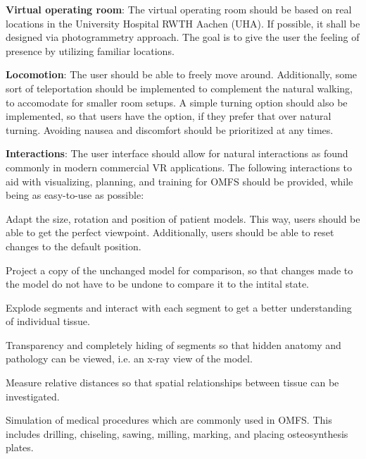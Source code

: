 \begin{compactenum}[label=(\textbf{\alph*})]
    \item\label{req::F1} \textbf{Virtual operating room}: The virtual operating room should be based on real locations in the University Hospital RWTH Aachen (UHA).
    If possible, it shall be designed via photogrammetry approach. The goal is to give the user the feeling of presence by utilizing familiar locations.
    \item\label{req::F2} \textbf{Locomotion}: The user should be able to freely move around.
    Additionally, some sort of teleportation should be implemented to complement the natural walking, to accomodate for smaller room setups.
    A simple turning option should also be implemented, so that users have the option, if they prefer that over natural turning.
    Avoiding nausea and discomfort should be prioritized at any times.
    \item\label{req::F3} \textbf{Interactions}: The user interface should allow for natural interactions as found commonly in modern commercial VR applications.
    The following interactions to aid with visualizing, planning, and training for OMFS should be provided, while being as easy-to-use as possible:
    \begin{compactenum}[label=(\textbf{\alph*})]
        \item \label{req::F3.1}Adapt the size, rotation and position of patient models.
        This way, users should be able to get the perfect viewpoint.
        Additionally, users should be able to reset changes to the default position.
        \item \label{req::F3.2}Project a copy of the unchanged model for comparison, so that changes made to the model do not have to be undone to compare it to the intital state.
        \item \label{req::F3.3}Explode segments and interact with each segment to get a better understanding of individual tissue.
        \item \label{req::F3.4}Transparency and completely hiding of segments so that hidden anatomy and pathology can be viewed, i.e. an x-ray view of the model.
        \item \label{req::F3.5}Measure relative distances so that spatial relationships between tissue can be investigated.
        \item \label{req::F3.6}Simulation of medical procedures which are commonly used in OMFS.
        This includes drilling, chiseling, sawing, milling, marking, and placing osteosynthesis plates.

\end{compactenum}
\end{compactenum}
